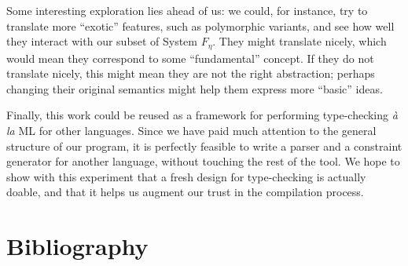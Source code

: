 \documentclass[10pt,a4paper,twoside,titlepage,twocolumn]{article}
\begin{document}
Some interesting exploration lies ahead of us: we could, for instance, try to
translate more ``exotic'' features, such as polymorphic variants, and see how
well they interact with our subset of System $F_\eta$. They might translate
nicely, which would mean they correspond to some ``fundamental'' concept. If
they do not translate nicely, this might mean they are not the right
abstraction; perhaps changing their original semantics might help them express
more ``basic'' ideas.

Finally, this work could be reused as a framework for performing type-checking
\emph{à la} ML for other languages. Since we have paid much attention to the
general structure of our program, it is perfectly feasible to write a parser and
a constraint generator for another language, without touching the rest of the
tool. We hope to show with this experiment that a fresh design for type-checking
is actually doable, and that it helps us augment our trust in the compilation
process.

\part{Bibliography}



\end{document}
